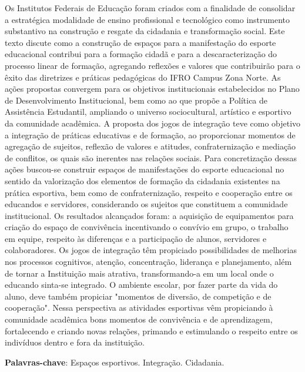 \documentclass[article,12pt,onesidea,4paper,english,brazil]{abntex2}
\begin{document}
	\noindent Os Institutos Federais de Educação foram criados com a finalidade de consolidar a estratégica modalidade de ensino profissional e tecnológico como instrumento substantivo na construção e resgate da cidadania e transformação social. Este texto discute como a construção de espaços para a manifestação do esporte educacional contribui para a formação cidadã e para a descaracterização do processo linear de formação, agregando reflexões e valores que contribuirão para o êxito das diretrizes e práticas pedagógicas do IFRO Campus Zona Norte. As ações propostas convergem para os objetivos institucionais estabelecidos no Plano de Desenvolvimento Institucional, bem como ao que propõe a Política de Assistência Estudantil, ampliando o universo sociocultural, artístico e esportivo da comunidade acadêmica. A proposta dos jogos de integração teve como objetivo a integração de práticas educativas e de formação, ao proporcionar momentos de agregação de sujeitos, reflexão de valores e atitudes, confraternização e mediação de conflitos, os quais são inerentes nas relações sociais. Para concretização dessas ações buscou-se construir espaços de manifestações do esporte educacional no sentido da valorização dos elementos de formação da cidadania existentes na prática esportiva, bem como de confraternização, respeito e cooperação entre os educandos e servidores, considerando os sujeitos que constituem a comunidade institucional. Os resultados alcançados foram: a aquisição de equipamentos para criação do espaço de convivência incentivando o convívio em grupo, o trabalho em equipe, respeito às diferenças e a participação de alunos, servidores e colaboradores. Os jogos de integração têm propiciado possibilidades de melhorias nos processos cognitivos, atenção, concentração, liderança e planejamento, além de tornar a Instituição mais atrativa, transformando-a em um local onde o educando sinta-se integrado. O ambiente escolar, por fazer parte da vida do aluno, deve também propiciar "momentos de diversão, de competição e de cooperação". Nessa perspectiva as atividades esportivas vêm propiciando à comunidade acadêmica bons momentos de convivência e de aprendizagem, fortalecendo e criando novas relações, primando e estimulando o respeito entre os indivíduos dentro e fora da instituição.
	
	\vspace{\onelineskip}
	
	\noindent
	\textbf{Palavras-chave}: Espaços esportivos. Integração. Cidadania.
	
\end{document}
